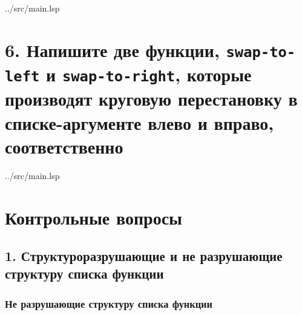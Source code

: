 \clearpage

\begin{lstinputlisting}[
	caption={Задание 5},
	label={lst:t5},
	style={lsp},
	linerange={27-44},
	]{../src/main.lsp}
\end{lstinputlisting}

\section*{6. Напишите две функции, \texttt{swap-to-left} и \texttt{swap-to-right}, которые производят круговую перестановку в списке-аргументе влево и вправо, соответственно}

\begin{lstinputlisting}[
	caption={Задание 6},
	label={lst:t6},
	style={lsp},
	linerange={46-53},
	]{../src/main.lsp}
\end{lstinputlisting}

\section*{Контрольные вопросы}

\subsection*{1. Структуроразрушающие и не разрушающие структуру списка функции}

\subsubsection{Не разрушающие структуру списка функции}

